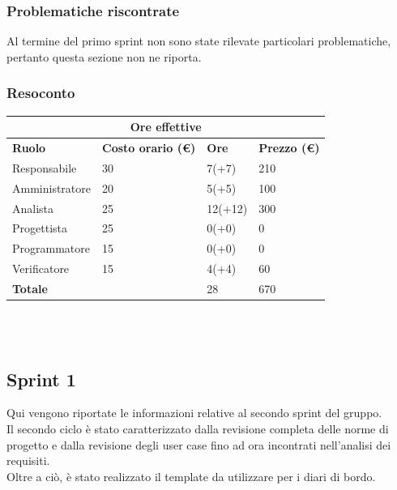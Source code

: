 \documentclass[9pt]{article}
\begin{document}
\subsubsection{Problematiche riscontrate}
Al termine del primo sprint non sono state rilevate particolari problematiche, pertanto questa sezione non ne riporta.
\subsubsection{Resoconto}
\begin{center}
	\begin{tabularx}{\textwidth}{|X|X|X|X|}
		\hline
		\multicolumn{4}{|c|}{\textbf{Ore effettive}}                                      \\
		\hline
		\hline
		\textbf{Ruolo}  & \textbf{Costo orario (\euro)} & \textbf{Ore} & \textbf{Prezzo (\euro)} \\
		\hline
		Responsabile    & 30                            & 7(+7)        & 210                     \\
		\hline
		Amministratore  & 20                            & 5(+5)        & 100                     \\
		\hline
		Analista        & 25                            & 12(+12)      & 300                     \\
		\hline
		Progettista     & 25                            & 0(+0)        & 0                       \\
		\hline
		Programmatore   & 15                            & 0(+0)        & 0                       \\
		\hline
		Verificatore    & 15                            & 4(+4)        & 60                      \\
		\hline
		\hline
		\textbf{Totale} &                               & 28           & 670                     \\
		\hline
	\end{tabularx}\\[8pt]
	\mbox{}\\
\end{center}


\subsection{Sprint 1}
Qui vengono riportate le informazioni relative al secondo sprint del gruppo. \\
Il secondo ciclo è stato caratterizzato dalla revisione completa delle norme di progetto e dalla revisione degli user case fino ad ora incontrati nell'analisi dei requisiti.\\
Oltre a ciò, è stato realizzato il template da utilizzare per i diari di bordo.
\end{document}
